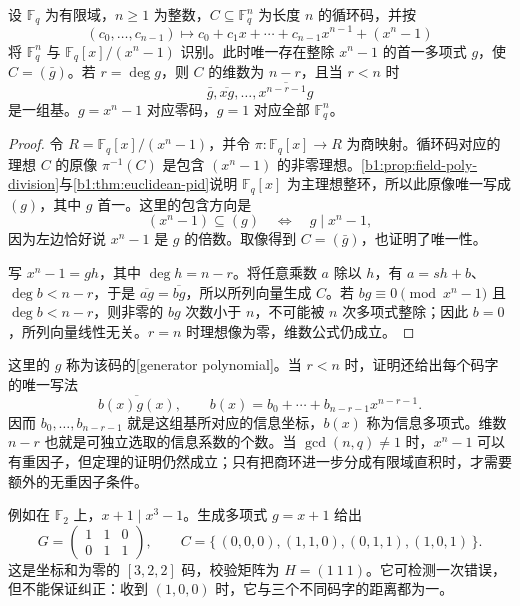 \begin{theorem}\label{b1:thm:B-cyclic-generator}
	设 \(\mathbb F_q\) 为有限域，\(n\geq1\) 为整数，\(C\subseteq\mathbb F_q^n\) 为长度 \(n\) 的循环码，并按
	\[
		(c_0,\ldots,c_{n-1})\longmapsto c_0+c_1x+\cdots+c_{n-1}x^{n-1}+(x^n-1)
	\]
	将 \(\mathbb F_q^n\) 与 \(\mathbb F_q[x]/(x^n-1)\) 识别。此时唯一存在整除 \(x^n-1\) 的首一多项式 \(g\)，使 \(C=(\bar g)\)。若 \(r=\deg g\)，则 \(C\) 的维数为 \(n-r\)，且当 \(r<n\) 时
	\[
		\bar g,\overline{xg},\ldots,\overline{x^{n-r-1}g}
	\]
	是一组基。\(g=x^n-1\) 对应零码，\(g=1\) 对应全部 \(\mathbb F_q^n\)。
\end{theorem}

\begin{proof}
	令 \(R=\mathbb F_q[x]/(x^n-1)\)，并令 \(\pi\colon\mathbb F_q[x]\rightarrow R\) 为商映射。循环码对应的理想 \(C\) 的原像 \(\pi^{-1}(C)\) 是包含 \((x^n-1)\) 的非零理想。\cref{b1:prop:field-poly-division}与\cref{b1:thm:euclidean-pid}说明 \(\mathbb F_q[x]\) 为主理想整环，所以此原像唯一写成 \((g)\)，其中 \(g\) 首一。这里的包含方向是
	\[
		(x^n-1)\subseteq(g) \quad\Longleftrightarrow\quad g\mid x^n-1,
	\]
	因为左边恰好说 \(x^n-1\) 是 \(g\) 的倍数。取像得到 \(C=(\bar g)\)，也证明了唯一性。

	写 \(x^n-1=gh\)，其中 \(\deg h=n-r\)。将任意乘数 \(a\) 除以 \(h\)，有 \(a=sh+b\)、\(\deg b<n-r\)，于是 \(\overline{ag}=\overline{bg}\)，所以所列向量生成 \(C\)。若 \(bg\equiv0\pmod{x^n-1}\) 且 \(\deg b<n-r\)，则非零的 \(bg\) 次数小于 \(n\)，不可能被 \(n\) 次多项式整除；因此 \(b=0\)，所列向量线性无关。\(r=n\) 时理想像为零，维数公式仍成立。
\end{proof}

这里的 \(g\) 称为该码的[generator polynomial]。当 \(r<n\) 时，证明还给出每个码字的唯一写法
\[
	\overline{b(x)g(x)},\qquad b(x)=b_0+\cdots+b_{n-r-1}x^{n-r-1}.
\]
因而 \(b_0,\ldots,b_{n-r-1}\) 就是这组基所对应的信息坐标，\(b(x)\) 称为信息多项式。维数 \(n-r\) 也就是可独立选取的信息系数的个数。当 \(\gcd(n,q)\ne1\) 时，\(x^n-1\) 可以有重因子，但定理的证明仍然成立；只有把商环进一步分成有限域直积时，才需要额外的无重因子条件。

\ProseParagraphBreak
例如在 \(\mathbb F_2\) 上，\(x+1\mid x^3-1\)。生成多项式 \(g=x+1\) 给出
\[
	G=\begin{pmatrix}1&1&0\\0&1&1\end{pmatrix},\qquad
	C=\{\,(0,0,0),(1,1,0),(0,1,1),(1,0,1)\,\}.
\]
这是坐标和为零的 \([3,2,2]\) 码，校验矩阵为 \(H=(1\ 1\ 1)\)。它可检测一次错误，但不能保证纠正：收到 \((1,0,0)\) 时，它与三个不同码字的距离都为一。

